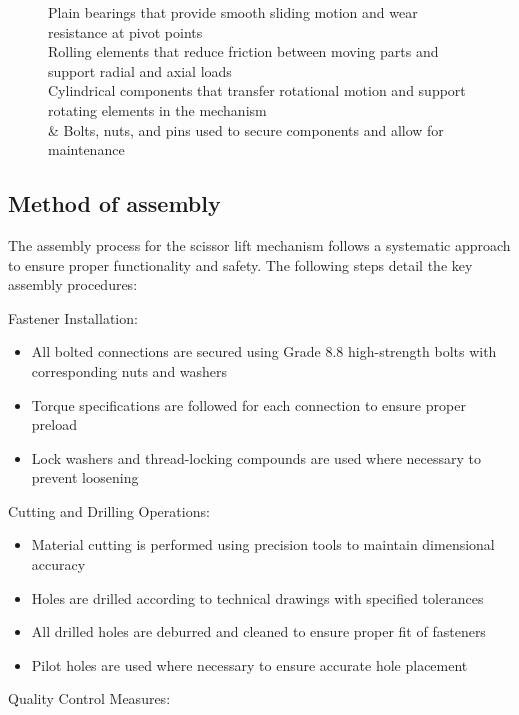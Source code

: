 \documentclass[../../main]{subfiles}
\begin{document}
\begin{figure}[h]
\begin{subfigure}[b]{0.495\textwidth}
  \caption[short]{}
  \label{e}
\end{subfigure}
\caption{
 Plain bearings that provide smooth sliding motion and wear resistance at pivot points\\
 Rolling elements that reduce friction between moving parts and support radial and axial loads\\
 Cylindrical components that transfer rotational motion and support rotating elements in the mechanism\\
 \&  Bolts, nuts, and pins used to secure components and allow for maintenance\\
} 
\end{figure}
\newpage
\subsection{Method of assembly}\label{method-of-assembly}

The assembly process for the scissor lift mechanism follows a systematic
approach to ensure proper functionality and safety. The following steps
detail the key assembly procedures:

Fastener Installation:

\begin{itemize}
\item
  All bolted connections are secured using Grade 8.8 high-strength bolts
  with corresponding nuts and washers
\item
  Torque specifications are followed for each connection to ensure
  proper preload
\item
  Lock washers and thread-locking compounds are used where necessary to
  prevent loosening
\end{itemize}

Cutting and Drilling Operations:

\begin{itemize}
\item
  Material cutting is performed using precision tools to maintain
  dimensional accuracy
\item
  Holes are drilled according to technical drawings with specified
  tolerances
\item
  All drilled holes are deburred and cleaned to ensure proper fit of
  fasteners
\item
  Pilot holes are used where necessary to ensure accurate hole placement
\end{itemize}

Quality Control Measures:
\end{document}
